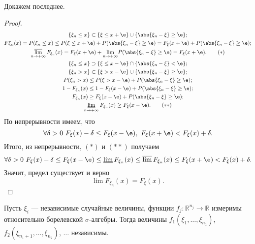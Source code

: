 Докажем последнее.

 \begin{proof}
 \begin{gather*}
     \{\xi_n\le x\} \subset \{\xi\le x+\e\}\cup \{\abs{\xi_n - \xi}\ge \e\}; \\
     F\xi_n (x) = P(\xi_n\le x) \le P(\xi\le x+\e) +P(\abs{\xi_n - \xi}\ge\e) = F_\xi(x + \e) + P(\abs{\xi_n - \xi}\ge \e); \\
     \varlimsup_{n\rightarrow +\infty} F_{\xi_n}(x) = F_\xi (x + \e) +
         \underset{n\rightarrow +\infty}{\lim} P(\abs{\xi_n - \xi}\ge\e) = F_\xi(x+\e). \label{eq:ier1}\tag{$*$}\\
    \{\xi_n \le x\} \supset \{\xi\le x - \e\}\cap \{\abs{\xi_n - \xi}< \e\};\\
    \{\xi_n >x\}\subset \{\xi > x - \e\} \cup \{\abs{\xi_n - \xi} \ge\e\};\\
    P(\xi_n > x) \le P(\xi > x-\e) + P(\abs{\xi_n - \xi}\ge\e); \\
    1 - F_{\xi_n}(x)\le 1-F_\xi(x-\e) +P(\abs{\xi_n - \xi}\ge\e);\\
    F_{\xi_n}(x) \ge F_\xi (x - \e) + P(\abs{\xi_n - \xi}\ge\e);\\
    \varliminf_{n \to +\infty} F_{\xi_n}(x)  \ge F_\xi (x-\e).\label{eq:ier2}\tag{$**$}
 \end{gather*}
    По непрерывности имеем, что
    $$\forall \delta > 0 \ F_\xi(x) - \delta \le F_\xi (x - \e) , \ F_\xi(x+\e) < F_\xi(x) + \delta.$$
     Итого, из непрерывности,  $(*)$ и $(**)$ получаем $$\forall \delta > 0 \ F_\xi(x) - \delta \le F_\xi (x - \e)\le
         \varliminf F_{\xi_n}(x) \le \varlimsup F_{\xi_n}(x) \le F_\xi(x+\e) < F_\xi(x) + \delta.$$
    Значит, предел существует и верно
    $$\lim F_{\xi_n}(x) = F_\xi (x).$$
 \end{proof}


 \begin{theorem}
     Пусть $\xi_i$ --- независимые случайные величины, функции $f_j \colon \mathbb{R}^{n_j} \rightarrow \mathbb{R}$ измеримы относительно борелевской $\sigma$-алгебры.
     Тогда величины $f_1(\xi_1, \ldots, \xi_{n_1})$, $f_2(\xi_{n_1 + 1}, \ldots, \xi_{n_2})$, $\ldots$ независимы.
 \end{theorem}

